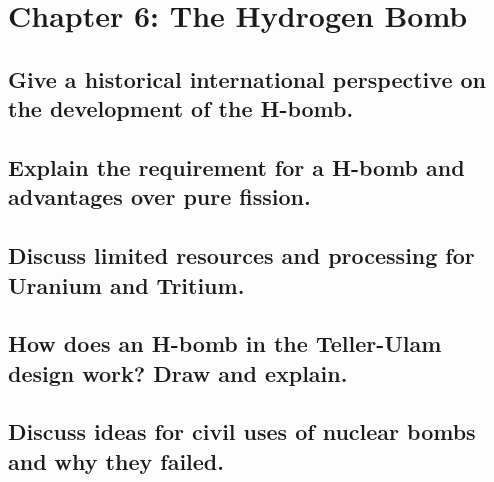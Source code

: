 \section{Chapter 6: The Hydrogen Bomb}

\subsection{Give a historical international perspective on the development of the H-bomb.}
\solutionblock{}

\subsection{Explain the requirement for a H-bomb and advantages over pure fission.}
\solutionblock{}

\subsection{Discuss limited resources and processing for Uranium and Tritium.}
\solutionblock{}

\subsection{How does an H-bomb in the Teller-Ulam design work? Draw and explain.}
\solutionblock{}

\subsection{Discuss ideas for civil uses of nuclear bombs and why they failed.}
\solutionblock{}
